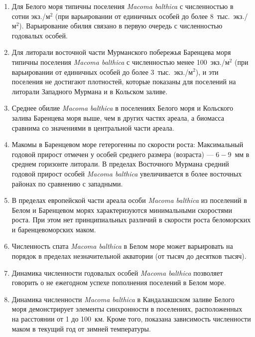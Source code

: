 	\begin{enumerate}
		\item Для Белого моря типичны поселения {\it Macoma balthica} с численностью в сотни экз./м$^2$ (при варьировании от единичных особей до более $8$~тыс.~экз./м$^2$). Варьирование обилия связано в первую очередь с численностью годовалых особей.
		\item Для литорали восточной части Мурманского побережья Баренцева моря типичны поселения {\it Macoma balthica} с численностью  менее 100~экз./м$^2$ (при варьировании от единичных особей до более $3$~тыс.~экз./м$^2$), и эти поселения не достигают плотностей, которые показаны для поселений на литорали Западного Мурмана и в Кольском заливе. %
		\item Среднее обилие {\it Macoma balthica} в поселениях Белого моря и Кольского залива Баренцева моря выше, чем в других частях ареала, а биомасса сравнима со значениями в центральной части ареала. 
		\item Макомы в Баренцевом море гетерогенны по скорости роста: Максимальный годовой прирост отмечен у особей среднего размера (возраста) --- $6 - 9$~мм в среднем горизонте литорали. В пределах Восточного Мурмана средний годовой прирост особей {\it Macoma balthica} увеличивается в более восточных районах по сравнению с западными.
		\item В пределах европейской части ареала особи {\it Macoma balthica} из поселений в Белом и Баренцевом морях характеризуются минимальными скоростями роста. При этом нет принципиальных различий в скорости роста беломорских и баренцевоморских маком.
		\item Численность спата {\it Macoma balthica} в Белом море может варьировать на порядок в пределах незначительной акватории (от тысяч до десятков тысяч).
		\item Динамика численности годовалых особей {\it Macoma balthica} позволяет говорить о не ежегодном успехе пополнения поселений в Белом море.
		\item Динамика численности {\it Macoma balthica} в Кандалакшском заливе Белого моря демонстрирует элементы синхронности в поселениях, расположенных на расстоянии от 1 до 100~км. Кроме того, показана зависимость численности маком в текущий год от зимней температуры.

\end{enumerate}
